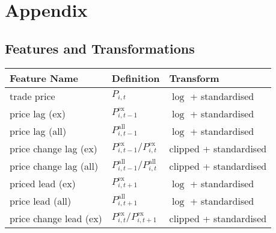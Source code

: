 \section{Appendix}


\subsection{Features and Transformations}
\label{app:feature-and-transformations}

\begin{table}[H]
    \centering
    \begin{threeparttable}
        \begin{tabular}{@{}lll@{}}
            \toprule
            Feature Name            & Definition                                                                                       & Transform \\ \midrule
            trade price             & $P_{i, t}$                                                                                       & $\log$ + standardised \\
            price lag (ex)          & $P_{i, t-1}^{\text{ex}}$\tnote{*}                                                                & $\log$ + standardised          \\
            price lag (all)         & $P_{i, t-1}^{\text{all}}$\tnote{*}                                                               & $\log$ + standardised          \\
            price change lag (ex)   & $P_{i, t-1}^{\text{ex}}/P_{i, t}^{\text{ex}}$\tnote{*}                                           & clipped + standardised          \\
            price change lag (all)  & $P_{i, t-1}^{\text{all}}/P_{i, t}^{\text{all}}$\tnote{*}                                         & clipped + standardised          \\
            priced lead (ex)        & $P_{i, t+1}^{\text{ex}}$\tnote{*}                                                                & $\log$ + standardised          \\
            price lead (all)        & $P_{i, t+1}^{\text{all}}$\tnote{*}                                                               & $\log$ + standardised          \\
            price change lead (ex)  & $P_{i, t}^{\text{ex}}/P_{i, t+1}^{\text{ex}}$\tnote{*}                                           & clipped + standardised          \\

\end{tabular}
\end{threeparttable}
\end{table}
